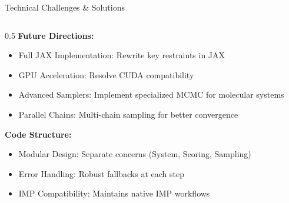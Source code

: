 \documentclass[aspectratio=169]{beamer}
\begin{document}
\begin{frame}{Technical Challenges \& Solutions}
\begin{columns}[T]
\begin{column}{0.5\textwidth}
\vspace{0.5cm}
\textbf{Future Directions:}

\begin{itemize}
    \item \alert{Full JAX Implementation}: Rewrite key restraints in JAX
    \item \alert{GPU Acceleration}: Resolve CUDA compatibility
    \item \alert{Advanced Samplers}: Implement specialized MCMC for molecular systems
    \item \alert{Parallel Chains}: Multi-chain sampling for better convergence
\end{itemize}

\vspace{0.5cm}
\textbf{Code Structure:}
\begin{itemize}
    \item \alert{Modular Design}: Separate concerns (System, Scoring, Sampling)
    \item \alert{Error Handling}: Robust fallbacks at each step
    \item \alert{IMP Compatibility}: Maintains native IMP workflows
\end{itemize}
\end{column}
\end{columns}
\end{frame}
\end{document}
